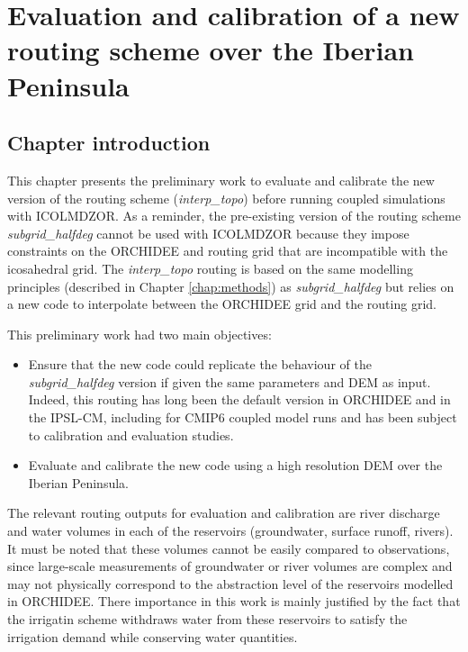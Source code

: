 \chapter{Evaluation and calibration of a new routing scheme over the Iberian Peninsula}
\label{chap:routing}
\minitoc
\pagebreak

\section{Chapter introduction}

This chapter presents the preliminary work to evaluate and calibrate the new version of the routing scheme (\textit{interp\_topo}) before running coupled simulations with ICOLMDZOR. As a reminder, the pre-existing version of the routing scheme \textit{subgrid\_halfdeg} cannot be used with ICOLMDZOR because they impose constraints on the ORCHIDEE and routing grid that are incompatible with the icosahedral grid.
The \textit{interp\_topo} routing is based on the same modelling principles (described in Chapter \ref{chap:methods}) as \textit{subgrid\_halfdeg} but relies on a new code to interpolate between the ORCHIDEE grid and the routing grid. 

This preliminary work had two main objectives:
\begin{itemize}
    \item Ensure that the new code could replicate the behaviour of the \textit{subgrid\_halfdeg} version if given the same parameters and DEM as input. 
    Indeed, this routing has long been the default version in ORCHIDEE and in the IPSL-CM, including for CMIP6 coupled model runs and has been subject to calibration and evaluation studies. %
    \item Evaluate and calibrate the new code using a high resolution DEM over the Iberian Peninsula.
\end{itemize}

The relevant routing outputs for evaluation and calibration are river discharge and water volumes in each of the reservoirs (groundwater, surface runoff, rivers). 
It must be noted that these volumes cannot be easily compared to observations, since large-scale measurements of groundwater or river volumes are complex and may not physically correspond to the abstraction level of the reservoirs modelled in ORCHIDEE.
There importance in this work is mainly justified by the fact that the irrigatin scheme withdraws water from these reservoirs to satisfy the irrigation demand while conserving water quantities.

